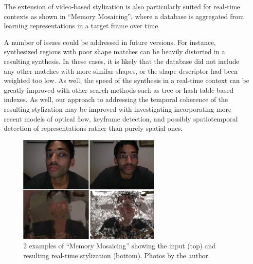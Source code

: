 \documentclass[a4paper,11pt,final]{ThesisStyle}
\begin{document}
The extension of video-based stylization is also particularly suited for real-time contexts as shown in ``Memory Mosaicing'', where a database is aggregated from learning representations in a target frame over time. 

A number of issues could be addressed in future versions.  For instance, synthesized regions with poor shape matches can be heavily distorted in a resulting synthesis.  In these cases, it is likely that the database did not include any other matches with more similar shapes, or the shape descriptor had been weighted too low.  As well, the speed of the synthesis in a real-time context can be greatly improved with other search methods such as tree or hash-table based indexes.  As well, our approach to addressing the temporal coherence of the resulting stylization may be improved with investigating incorporating more recent models of optical flow, keyframe detection, and possibly spatiotemporal detection of representations rather than purely spatial ones.   

\begin{figure}[h]
  \centering
  \includegraphics[width=2.8in]{images/memory-mosaic-2x2.png}
  \caption{2 examples of ``Memory Mosaicing'' showing the input (top) and resulting real-time stylization (bottom).   Photos by the author.}
  \label{fig:memory-mosaicing}
\end{figure}



\end{document}
